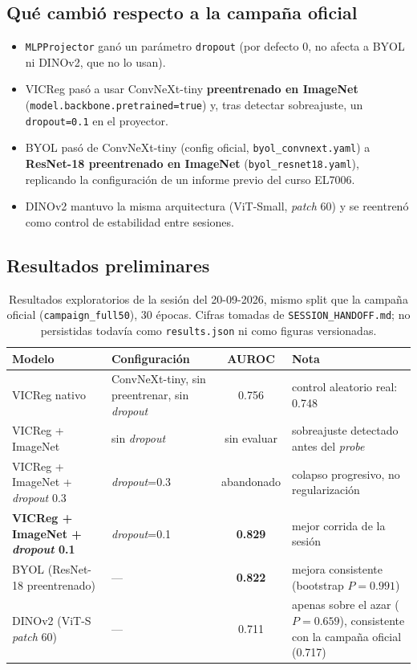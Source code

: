\documentclass[11pt,a4paper]{article}
\begin{document}
\subsection{Qué cambió respecto a la campaña oficial}

\begin{itemize}
\item \texttt{MLPProjector} ganó un parámetro \texttt{dropout} (por defecto
  $0$, no afecta a BYOL ni DINOv2, que no lo usan).
\item VICReg pasó a usar ConvNeXt-tiny \textbf{preentrenado en ImageNet}
  (\texttt{model.backbone.\allowbreak pretrained=true}) y, tras detectar
  sobreajuste, un \texttt{dropout=0.1} en el proyector.
\item BYOL pasó de ConvNeXt-tiny (config oficial,
  \texttt{byol\_convnext.yaml}) a \textbf{ResNet-18 preentrenado en
  ImageNet} (\texttt{byol\_resnet18.yaml}), replicando la configuración de
  un informe previo del curso EL7006.
\item DINOv2 mantuvo la misma arquitectura (ViT-Small, \emph{patch} 60) y se
  reentrenó como control de estabilidad entre sesiones.
\end{itemize}

\subsection{Resultados preliminares}

\begin{table}[htbp]
\centering
\small
\begin{tabular}{p{2.9cm}p{3.0cm}cp{4.6cm}}
\toprule
\textbf{Modelo} & \textbf{Configuración} & \textbf{AUROC} & \textbf{Nota} \\
\midrule
VICReg nativo & ConvNeXt-tiny, sin preentrenar, sin \emph{dropout} & 0.756 & control aleatorio real: 0.748 \\
VICReg + ImageNet & sin \emph{dropout} & sin evaluar & sobreajuste detectado antes del \emph{probe} \\
VICReg + ImageNet + \emph{dropout} 0.3 & \emph{dropout}=0.3 & abandonado & colapso progresivo, no regularización \\
\textbf{VICReg + ImageNet + \emph{dropout} 0.1} & \emph{dropout}=0.1 & \textbf{0.829} & mejor corrida de la sesión \\
BYOL (ResNet-18 preentrenado) & --- & \textbf{0.822} & mejora consistente (bootstrap $P{=}0.991$) \\
DINOv2 (ViT-S \emph{patch} 60) & --- & 0.711 & apenas sobre el azar ($P{=}0.659$), consistente con la campaña oficial (0.717) \\
\bottomrule
\end{tabular}
\caption{Resultados exploratorios de la sesión del 20-09-2026, mismo split
que la campaña oficial (\texttt{campaign\_full50}), 30 épocas. Cifras
tomadas de \texttt{SESSION\_HANDOFF.md}; no persistidas todavía como
\texttt{results.json} ni como figuras versionadas.}
\label{tab:extension}
\end{table}
\end{document}
